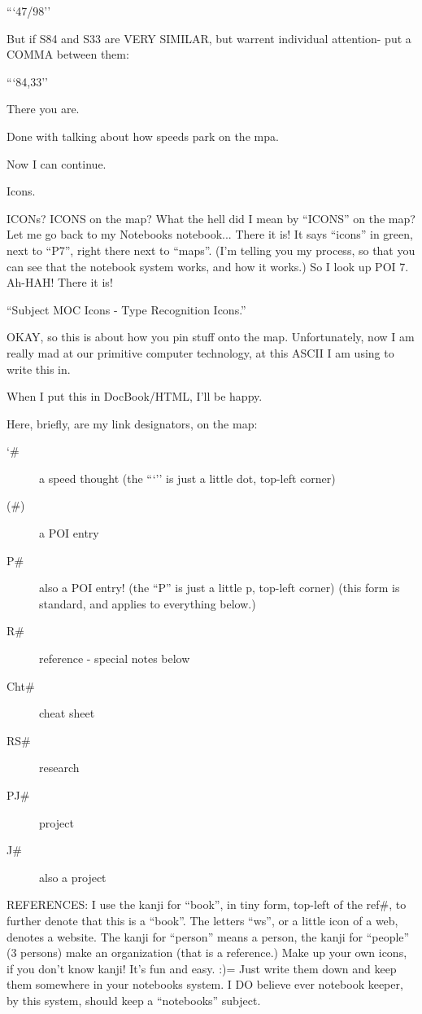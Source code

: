 \documentclass[oneside]{book}
\begin{document}
```47/98''

But if S84 and S33 are VERY SIMILAR, but warrent individual attention-
put a COMMA between them:

```84,33''

There you are.

Done with talking about how speeds park on the mpa.

Now I can continue.

Icons.

ICONs? ICONS on the map? What the hell did I mean by ``ICONS'' on the
map? Let me go back to my Notebooks notebook... There it is! It says
``icons'' in green, next to ``P7'', right there next to ``maps''. (I'm
telling you my process, so that you can see that the notebook system
works, and how it works.) So I look up POI 7. Ah-HAH! There it is!

``Subject MOC Icons - Type Recognition Icons.''

OKAY, so this is about how you pin stuff onto the map. Unfortunately,
now I am really mad at our primitive computer technology, at this
ASCII I am using to write this in.

When I put this in DocBook/HTML, I'll be happy.

Here, briefly, are my link designators, on the map:

\begin{description}
\item[`\#]            a speed thought
              (the ```'' is just a little dot, top-left corner)
\item[(\#)]           a POI entry
\item[P\#]            also a POI entry!
              (the ``P'' is just a little p, top-left corner)
              (this form is standard, and applies to everything below.)
\item[R\#]            reference - special notes below
\item[Cht\#]          cheat sheet
\item[RS\#]           research
\item[PJ\#]           project
\item[J\#]            also a project
\end{description}

REFERENCES:
I use the kanji for ``book'', in tiny form, top-left of the ref\#, to
further denote that this is a ``book''. The letters ``ws'', or a little
icon of a web, denotes a website.  The kanji for ``person'' means a
person, the kanji for ``people'' (3 persons) make an organization (that
is a reference.) Make up your own icons, if you don't know kanji! It's
fun and easy. {:)}= Just write them down and keep them somewhere in
your notebooks system. I DO believe ever notebook keeper, by this
system, should keep a ``notebooks'' subject.
\end{document}
